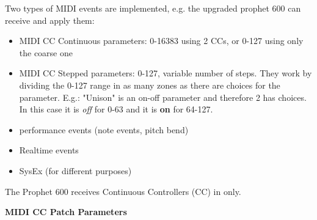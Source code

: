 Two types of MIDI events are implemented, e.g. the upgraded prophet 600 can receive and apply them:

\begin{itemize}
  \setlength\itemsep{0cm}
  \item MIDI CC Continuous parameters: 0-16383 using 2 CCs, or 0-127 using only the coarse one
  \item MIDI CC Stepped parameters: 0-127, variable number of steps. They work by dividing the 0-127 range in as many zones as there are choices for the parameter. E.g.: "Unison" is an on-off parameter and therefore 2 has choices. In this case it is \textit{off} for 0-63 and it is \textbf{on} for 64-127.
  \item performance events (note events, pitch bend)
  \item Realtime events
  \item SysEx (for different purposes)
\end{itemize}

The Prophet 600 receives Continuous Controllers (CC) in \presetmode only. 

\textbf{MIDI CC Patch Parameters} 

\footnotesize
\renewcommand{\arraystretch}{1.3}

